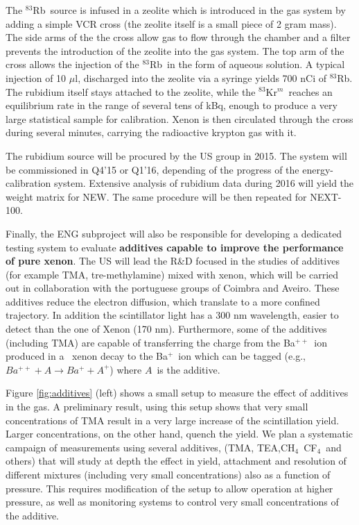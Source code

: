 The $^{83}$Rb~source is infused in a zeolite which is introduced in the gas system by adding a simple VCR cross (the zeolite itself is a small piece of 2 gram mass). The side arms of the the cross allow gas to flow through the chamber and a filter prevents the introduction of the zeolite into the gas system. The top arm of the cross allows the injection of the $^{83}$Rb~in the form of aqueous solution. A typical injection of 10 $\mu$l, discharged into the zeolite via a syringe yields 700 nCi of $^{83}$Rb. The rubidium itself stays attached to the zeolite, while the $^{83}$Kr$^m$~reaches an equilibrium rate in the range of several tens of kBq, enough to produce a very large statistical sample for calibration. Xenon is then circulated through the cross during several minutes, carrying the radioactive krypton gas with it.  

The rubidium source will be procured by the US group in 2015. The system will be commissioned in Q4'15 or Q1'16, depending of the progress of the energy-calibration system. Extensive analysis of rubidium data during 2016 will yield the weight matrix for NEW. The same procedure will be then repeated for NEXT-100. 

Finally, the ENG subproject will also be responsible for developing a dedicated testing system to evaluate {\bf additives capable to improve the performance of pure xenon}. The US will lead the R\&D focused in the studies of additives (for example TMA, tre-methylamine) mixed with xenon, which will be carried out in collaboration with the portuguese groups of Coimbra and Aveiro. These additives reduce the electron diffusion, which translate to a more confined trajectory.  In addition the scintillator light has  a 300 nm wavelength, easier to detect than the one of Xenon (170 nm). Furthermore, some of the additives (including TMA) are capable of transferring the charge from the Ba$^{++}$~ion produced in a \bb\ xenon decay to
the Ba$^{+}$~ion which can be tagged (e.g., $Ba^{++} + A \rightarrow Ba^{+} + A^{+}$) where $A$~is the additive. 

Figure \ref{fig:additives} (left) shows a small setup to measure the effect of additives in the gas. A preliminary result, using this setup shows that very small concentrations of TMA result in a very large increase of the scintillation yield. Larger concentrations, on the other hand, quench the yield. We plan a systematic campaign of measurements using several additives, (TMA, TEA,CH$_4$~CF$_4$~and others) that will study at depth the effect in yield, attachment and resolution of different mixtures (including very small concentrations) also as a function of pressure. This requires modification of the setup to allow operation at higher pressure, as well as monitoring systems to control very small concentrations of the additive. 

